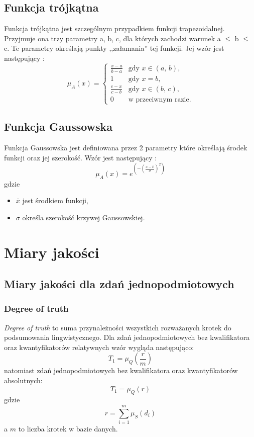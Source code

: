 \documentclass{classrep}
\begin{document}
	
	\subsection{Funkcja trójkątna}
	Funkcja trójkątna jest szczególnym przypadkiem funkcji trapezoidalnej. Przyjmuje ona trzy parametry a, b, c, dla których zachodzi warunek a $\leq$ b $\leq$ c. Te parametry określają punkty ,,załamania'' tej funkcji. Jej wzór jest następujący \cite{funkcje}: 
	\begin{equation}
	\mu_A(x) = \begin{cases}
	\frac{x-a}{b-a} & \mbox{gdy } x \in (a,\, b), \\
	1                 & \mbox{gdy } x = b, \\
	\frac{c-x}{c-b} & \mbox{gdy } x \in (b,\, c), \\
	0                 & \mbox{w przeciwnym razie}.
	\end{cases}
	\end{equation}
	
	
	
	
	\subsection{Funkcja Gaussowska} 
	Funkcja Gaussowska jest definiowana przez 2 parametry które określają środek funkcji oraz jej szerokość. Wzór jest następujący \cite{kul}:
	\begin{equation}
		\mu_A(x) = e^{(-(\frac{x - \bar{x}}{\sigma})^2)}
	\end{equation}
	gdzie 
	\begin{itemize}
		\item $\bar{x}$ jest środkiem funkcji,
		\item $\sigma$ określa szerokość krzywej Gaussowskiej. 
	\end{itemize}
	
	\section{Miary jakości}
	\subsection{Miary jakości dla zdań jednopodmiotowych}
	\subsubsection{Degree of truth}
\textsl{Degree of truth} to suma przynależności wszystkich rozważanych krotek do podsumowania lingwistycznego. Dla zdań jednopodmiotowych bez kwalifikatora oraz kwantyfikatorów relatywnych wzór wygląda następująco:
	\begin{equation}
	T_1 = \mu_Q(\frac{r}{m})
	\end{equation}
natomiast zdań jednopodmiotowych bez kwalifikatora oraz kwantyfikatorów absolutnych:
	\begin{equation}
	T_1 = \mu_Q(r)
	\end{equation}
gdzie 
	\begin{equation}
r = \sum_{i=1}^{m} \mu_{S} (d_i)
	\end{equation}
a $m$ to liczba krotek w bazie danych.
\end{document}
